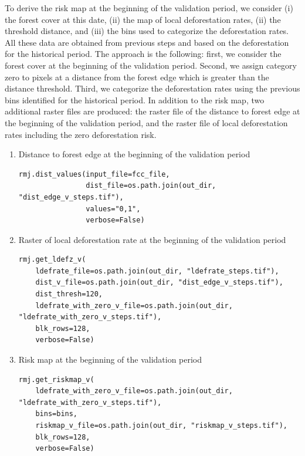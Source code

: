 \documentclass[paper=a4, 12pt, DIV=12]{scrartcl}
\begin{document}
To derive the risk map at the beginning of the validation period, we consider (i) the forest cover at this date, (ii) the map of local deforestation rates, (ii) the threshold distance, and (iii) the bins used to categorize the deforestation rates. All these data are obtained from previous steps and based on the deforestation for the historical period. The approach is the following: first, we consider the forest cover at the beginning of the validation period. Second, we assign category zero to pixels at a distance from the forest edge which is greater than the distance threshold. Third, we categorize the deforestation rates using the previous bins identified for the historical period. In addition to the risk map, two additional raster files are produced: the raster file of the distance to forest edge at the beginning of the validation period, and the raster file of local deforestation rates including the zero deforestation risk.

\begin{enumerate}
\item Distance to forest edge at the beginning of the validation period
\label{sec:orgb7454fd}

\begin{verbatim}
rmj.dist_values(input_file=fcc_file,
                dist_file=os.path.join(out_dir, "dist_edge_v_steps.tif"),
                values="0,1",
                verbose=False)
\end{verbatim}

\item Raster of local deforestation rate at the beginning of the validation period
\label{sec:orga5c210e}

\begin{verbatim}
rmj.get_ldefz_v(
    ldefrate_file=os.path.join(out_dir, "ldefrate_steps.tif"),
    dist_v_file=os.path.join(out_dir, "dist_edge_v_steps.tif"),
    dist_thresh=120,
    ldefrate_with_zero_v_file=os.path.join(out_dir, "ldefrate_with_zero_v_steps.tif"),
    blk_rows=128,
    verbose=False)
\end{verbatim}

\item Risk map at the beginning of the validation period
\label{sec:org8d814ea}

\begin{verbatim}
rmj.get_riskmap_v(
    ldefrate_with_zero_v_file=os.path.join(out_dir, "ldefrate_with_zero_v_steps.tif"),
    bins=bins,  
    riskmap_v_file=os.path.join(out_dir, "riskmap_v_steps.tif"),
    blk_rows=128,
    verbose=False)
\end{verbatim}
\end{enumerate}
\end{document}
